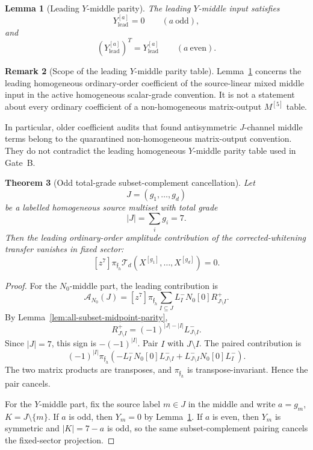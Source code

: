 \documentclass[11pt,a4paper]{amsart}
\theoremstyle{plain}
\newtheorem{theorem}{Theorem}[section]
\newtheorem{lemma}[theorem]{Lemma}
\theoremstyle{definition}
\newtheorem{remark}[theorem]{Remark}
\begin{document}
\begin{lemma}[Leading \(Y\)-middle parity]
\label{lem:leading-y-middle-parity}
The leading \(Y\)-middle input satisfies
\[
Y^{[a]}_{\mathrm{lead}}=0\qquad(a\ \mathrm{odd}),
\]
and
\[
(Y^{[a]}_{\mathrm{lead}})^T=Y^{[a]}_{\mathrm{lead}}
\qquad(a\ \mathrm{even}).
\]
\end{lemma}

\begin{remark}[Scope of the leading \(Y\)-middle parity table]
\label{rem:scope-leading-y-middle-parity-table}
Lemma~\ref{lem:leading-y-middle-parity} concerns the leading homogeneous
ordinary-order coefficient of the source-linear mixed middle input in the
active homogeneous scalar-grade convention.  It is not a statement about
every ordinary coefficient of a non-homogeneous matrix-output \(M^{[5]}\)
table.

In particular, older coefficient audits that found antisymmetric
\(J\)-channel middle terms belong to the quarantined non-homogeneous
matrix-output convention.  They do not contradict the leading homogeneous
\(Y\)-middle parity table used in Gate~B.
\end{remark}

\begin{theorem}[Odd total-grade subset-complement cancellation]
\label{thm:odd-total-grade-subset-complement-cancellation}
Let
\[
J=(g_1,\ldots,g_d)
\]
be a labelled homogeneous source multiset with total grade
\[
|J|=\sum_i g_i=7.
\]
Then the leading ordinary-order amplitude contribution of the
corrected-whitening transfer vanishes in fixed sector:
\[
\boxed{
[z^7]\pi_{\mathfrak f_h}
\mathcal T_d(X^{[g_1]},\ldots,X^{[g_d]})=0.
}
\]
\end{theorem}

\begin{proof}
For the \(N_0\)-middle part, the leading contribution is
\[
\mathcal A_{N_0}(J)
=
[z^7]\pi_{\mathfrak f_h}
\sum_{I\subseteq J}L_I^-N_0[0]R^+_{J\setminus I}.
\]
By Lemma~\ref{lem:all-subset-midpoint-parity},
\[
R^+_{J\setminus I}=(-1)^{|J|-|I|}L^-_{J\setminus I}.
\]
Since \(|J|=7\), this sign is \(-(-1)^{|I|}\).  Pair \(I\) with
\(J\setminus I\).  The paired contribution is
\[
(-1)^{|I|}
\pi_{\mathfrak f_h}
\left(
-L_I^-N_0[0]L^-_{J\setminus I}
+
L^-_{J\setminus I}N_0[0]L_I^-
\right).
\]
The two matrix products are transposes, and \(\pi_{\mathfrak f_h}\) is
transpose-invariant.  Hence the pair cancels.

For the \(Y\)-middle part, fix the source label \(m\in J\) in the middle
and write \(a=g_m\), \(K=J\setminus\{m\}\).  If \(a\) is odd, then
\(Y_m=0\) by Lemma~\ref{lem:leading-y-middle-parity}.  If \(a\) is even,
then \(Y_m\) is symmetric and \(|K|=7-a\) is odd, so the same
subset-complement pairing cancels the fixed-sector projection.
\end{proof}
\end{document}
